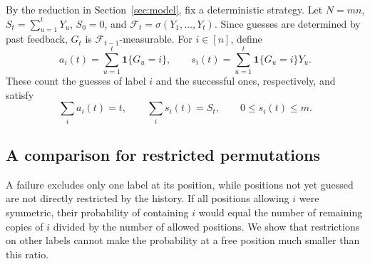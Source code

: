 \documentclass[11pt,reqno]{amsart}
\numberwithin{equation}{section}
\theoremstyle{remark}
\theoremstyle{definition}
\newcommand{\ind}{\mathbf 1}
\begin{document}
By the reduction in Section~\ref{sec:model}, fix a deterministic strategy. Let $N=mn$, $S_t=\sum_{u=1}^tY_u$, $S_0=0$, and $\mathcal F_t=\sigma(Y_1,\ldots,Y_t)$. Since guesses are determined by past feedback, $G_t$ is $\mathcal F_{t-1}$-measurable. For $i\in[n]$, define
\[
 a_i(t)=\sum_{u=1}^t\ind\{G_u=i\},\qquad
 s_i(t)=\sum_{u=1}^t\ind\{G_u=i\}Y_u.
\]
These count the guesses of label $i$ and the successful ones, respectively, and satisfy
\[
 \sum_i a_i(t)=t,\qquad \sum_i s_i(t)=S_t,\qquad
 0\le s_i(t)\le m.
\]

\subsection{A comparison for restricted permutations}
A failure excludes only one label at its position, while positions not yet guessed are not directly restricted by the history. If all positions allowing $i$ were symmetric, their probability of containing $i$ would equal the number of remaining copies of $i$ divided by the number of allowed positions. We show that restrictions on other labels cannot make the probability at a free position much smaller than this ratio.
\end{document}
